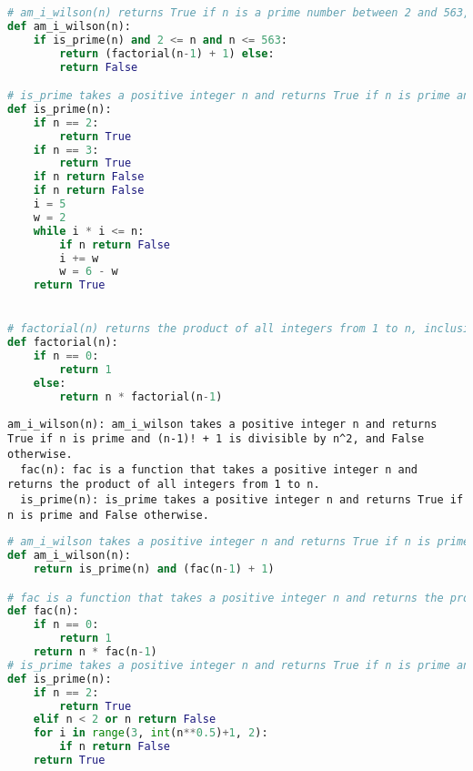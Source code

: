 \begin{figure*}
\begin{lstlisting}[language=Python]
# am_i_wilson(n) returns True if n is a prime number between 2 and 563, inclusive, and False otherwise.
def am_i_wilson(n):
    if is_prime(n) and 2 <= n and n <= 563:
        return (factorial(n-1) + 1) else:
        return False

# is_prime takes a positive integer n and returns True if n is prime and False otherwise.
def is_prime(n):
    if n == 2:
        return True
    if n == 3:
        return True
    if n return False
    if n return False
    i = 5
    w = 2
    while i * i <= n:
        if n return False
        i += w
        w = 6 - w
    return True


# factorial(n) returns the product of all integers from 1 to n, inclusive.
def factorial(n):
    if n == 0:
        return 1
    else:
        return n * factorial(n-1)
\end{lstlisting}
\caption{Train Problem 3229, Solution 26}
\end{figure*}

\begin{figure*}
\begin{lstlisting}
am_i_wilson(n): am_i_wilson takes a positive integer n and returns True if n is prime and (n-1)! + 1 is divisible by n^2, and False otherwise.
  fac(n): fac is a function that takes a positive integer n and returns the product of all integers from 1 to n.
  is_prime(n): is_prime takes a positive integer n and returns True if n is prime and False otherwise.
\end{lstlisting}
\caption{Train Problem 3229, Solution 71}
\end{figure*}

\begin{figure*}
\begin{lstlisting}[language=Python]
# am_i_wilson takes a positive integer n and returns True if n is prime and (n-1)! + 1 is divisible by n^2, and False otherwise.
def am_i_wilson(n):
    return is_prime(n) and (fac(n-1) + 1) 

# fac is a function that takes a positive integer n and returns the product of all integers from 1 to n.
def fac(n):
    if n == 0:
        return 1
    return n * fac(n-1)
# is_prime takes a positive integer n and returns True if n is prime and False otherwise.
def is_prime(n):
    if n == 2:
        return True
    elif n < 2 or n return False
    for i in range(3, int(n**0.5)+1, 2):
        if n return False
    return True
\end{lstlisting}
\caption{Train Problem 3229, Solution 71}
\end{figure*}

